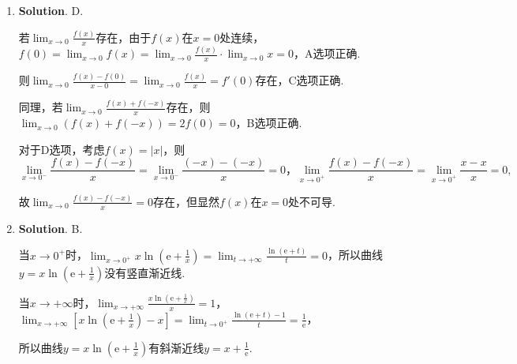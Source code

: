 \documentclass[../Main.tex]{subfiles}
\begin{document}
\begin{enumerate}
          当$x\to0^{+}$时，
          \[
              \begin{gathered}
                  1-\mathrm{e}^{\sqrt{x}}=-\left(\mathrm{e}^{\sqrt{x}}-1\right)\sim -\sqrt{x},\\
                  \sqrt{1+\sqrt{x}}-1=\left(1+\sqrt{x}\right)^{\frac{1}{2}}-1\sim\frac{1}{2}\sqrt{x},\\
                  \ln\frac{1+x}{1-\sqrt{x}}=\ln\left(1+x\right)-\ln\left(1-\sqrt{x}\right)\sim
                  x+\sqrt{x}\sim\sqrt{x},\\
                  1-\cos{\sqrt{x}}=1-\left(1-\frac{1}{2}x+o(x)\right)\sim\frac{1}{2}x.
              \end{gathered}
          \]

    \item \textbf{Solution}. D.

          若$\lim_{x\to0}\frac{f(x)}{x}$存在，由于$f(x)$在$x=0$处连续，$f(0)=\lim_{x\to0}
              f(x)=\lim_{x\to0}\frac{f(x)}{x}\cdot \lim_{x\to0}x=0$，A选项正确.

          则$\lim_{x\to0}\frac{f(x)-f(0)}{x-0}=\lim_{x\to0}\frac{f(x)}{x}=f'(0)$存在，C选项正确.

          同理，若$\lim_{x\to0}\frac{f(x)+f(-x)}{x}$存在，则$\lim_{x\to0}\left(f(x)+f
              (-x)\right)=2f(0)=0$，B选项正确.

          对于D选项，考虑$f(x)=|x|$，则
          \[
              \lim_{x\to0^-}\frac{f(x)-f(-x)}{x}=\lim_{x\to0^-}\frac{(-x)-(-x)}{x}= 0 \text{，}
              \lim_{x\to0^+}\frac{f(x)-f(-x)}{x}=\lim_{x\to0^+}\frac{x-x}{x}=0,
          \]

          故$\lim_{x\to0}\frac{f(x)-f(-x)}{x}=0$存在，但显然$f(x)$在$x=0$处不可导.

    \item \textbf{Solution}. B.

          当$x\to0^{+}$时，$\lim_{x\to0^+}x\ln\left(\mathrm{e}+\frac{1}{x}\right)=\lim
              _{t\to+\infty}\frac{\ln(\mathrm{e}+t)}{t}=0$，所以曲线$y=x\ln\left(\mathrm{e}
              +\frac{1}{x}\right)$没有竖直渐近线.

          当$x\to+\infty$时，$\lim_{x\to+\infty}\frac{x\ln\left(\mathrm{e}+\frac{1}{x}\right)}{x}
              =1$，$\lim_{x\to+\infty}\left[x\ln\left(\mathrm{e}+\frac{1}{x}\right)-x\right
              ]=\lim_{t\to0^+}\frac{\ln(\mathrm{e}+t)-1}{t}=\frac{1}{\mathrm{e}}$，

          所以曲线$y=x\ln\left(\mathrm{e}+\frac{1}{x}\right)$有斜渐近线$y=x+\frac{1}{\mathrm{e}}$.


\end{enumerate}
\end{document}
